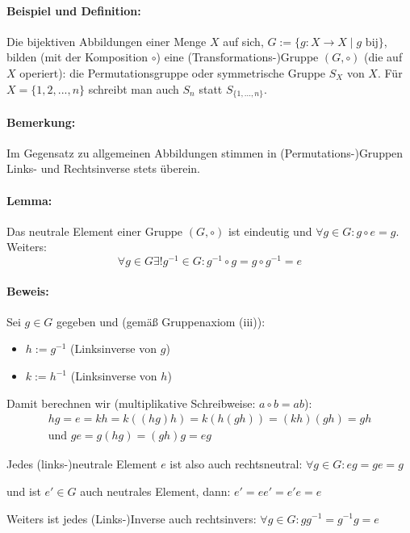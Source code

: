 \paragraph{Beispiel und Definition:}
	Die bijektiven Abbildungen einer Menge $X$ auf sich, $G:= \{g:X\to X\mid g \text{ bij}\}$, bilden (mit der Komposition $\circ$) eine (Transformations-)Gruppe $(G,\circ )$ (die auf $X$ operiert): die Permutationsgruppe oder symmetrische Gruppe $S_X$ von $X$. Für $X=\{1,2,...,n\}$ schreibt man auch $S_n$ statt $S_{\{1,...,n\}}$.
\paragraph{Bemerkung:}
	Im Gegensatz zu allgemeinen Abbildungen stimmen in (Permutations-)Gruppen Links- und Rechtsinverse stets überein.
\paragraph{Lemma:}
	Das neutrale Element einer Gruppe $(G,\circ )$ ist eindeutig und $\forall g\in G: g\circ e = g$. Weiters: 
	\begin{equation*}
		\forall g\in G \exists ! g^{-1} \in G: g^{-1}\circ g = g \circ g^{-1} = e
	\end{equation*}

\paragraph{Beweis:}
	Sei $g\in G$ gegeben und (gemäß Gruppenaxiom (iii)):
	\begin{itemize}
		\item $h:= g^{-1}$ (Linksinverse von $g$)
		\item $k:= h^{-1}$ (Linksinverse von $h$)
	\end{itemize}
	
	Damit berechnen wir (multiplikative Schreibweise: $a\circ b = ab$):
	\begin{gather*}
		hg = e = kh = k((hg)h) = k(h(gh)) = (kh)(gh) = gh\\
	\text{und }	ge = g(hg) = (gh)g = eg
	\end{gather*}
	
	Jedes (links-)neutrale Element $e$ ist also auch rechtsneutral:\hfill
	$\forall g\in G: eg = ge = g$
	
	und ist $e'\in G$ auch neutrales Element, dann:\hfill
	$ e' = ee' = e'e = e $

	Weiters ist jedes (Links-)Inverse auch rechtsinvers:\hfill
	$ \forall g \in G: gg^{-1}=g^{-1}g = e $

